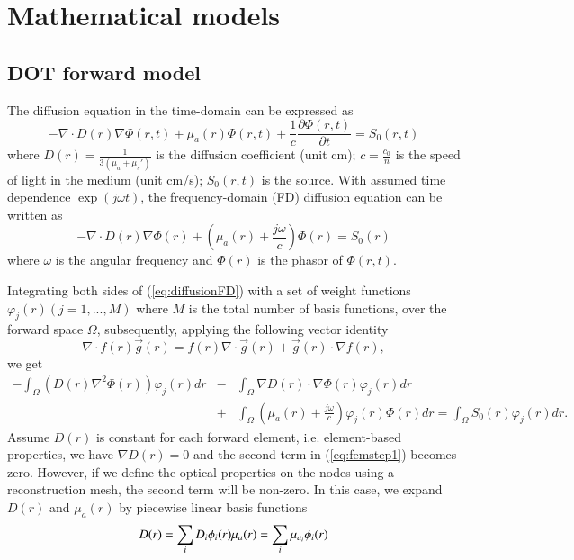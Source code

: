\documentclass[12pt]{book}               %
\begin{document}
\chapter{Mathematical models}

\section{DOT forward model}

The diffusion equation in the time-domain can be expressed as~\cite{Arridge1999}
\begin{equation}
\label{eq:diffusionTD} -\nabla\cdot
D(r)\nabla\Phi(r,t)+\mu_a(r)\Phi(r,t)+\frac{1}{c}\frac{\partial
\Phi(r,t)}{\partial t}=S_0(r,t)
\end{equation}
where $D(r)=\frac{1}{3(\mu_a+\mu_s')}$ is the diffusion
coefficient (unit cm); $c=\frac{c_0}{n}$ is the speed of light in the
medium (unit cm/s); $S_0(r,t)$ is the source. With assumed time dependence
$\exp(j\omega t)$, the frequency-domain (FD) diffusion equation can be
written as
\begin{equation}
\label{eq:diffusionFD} -\nabla\cdot
D(r)\nabla\Phi(r)+\left(\mu_a(r)+\frac{j\omega}{c}\right)\Phi(r)=S_0(r)
\end{equation}
where $\omega$ is the angular frequency and $\Phi(r)$ is the
phasor of $\Phi(r,t)$.

Integrating both sides of (\ref{eq:diffusionFD}) with a set of weight functions $\varphi_j(r) (j=1,...,M)$
where $M$ is the total number of basis functions, over the forward space $\Omega$, subsequently, applying the following vector
identity
\begin{equation}
\label{eq:veciden}\nabla\cdot f(r)\vec{g}(r)=f(r)\nabla\cdot
\vec{g}(r)+\vec{g}(r)\cdot\nabla f(r),
\end{equation}
we get
\begin{eqnarray}
\label{eq:femstep1}
-\int_{\Omega}{(D(r)\nabla^2\Phi(r))\varphi_j(r)dr}&-&\int_{\Omega}{\nabla D(r)\cdot\nabla\Phi(r)
\varphi_j(r)dr}\\\nonumber &+&\int_{\Omega}
{\left(\mu_a(r)+\frac{j\omega}{c}\right)\varphi_j(r)\Phi(r)dr}=\int_{\Omega}
{S_0(r)\varphi_j(r)dr}.
\end{eqnarray}
Assume $D(r)$ is constant for each forward element, i.e. element-based properties, 
we have $\nabla D(r)=0$ and the second term in (\ref{eq:femstep1}) becomes zero. 
However, if we define the optical properties on the nodes using a reconstruction mesh,
the second term will be non-zero. In this case, we expand $D(r)$ and $\mu_{a}(r)$ by
piecewise linear basis functions
\begin{equation}
\label{eq:parammesh}D(r)=\sum_{i}D_i\phi_i(r) \\
\mu_{a}(r)=\sum_{i}\mu_{a_i}\phi_i(r)
\end{equation}
\end{document}
